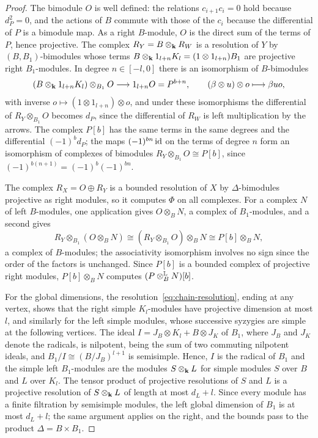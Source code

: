 \begin{proof}
  The bimodule $O$ is well defined: the relations ${c_{i+1}c_i=0}$ hold because
  ${d_P^2=0}$, and the actions of $B$ commute with those of the $c_i$ because the
  differential of $P$ is a bimodule map. As a right $B$-module, $O$ is the
  direct sum of the terms of $P$, hence projective. The complex
  ${R_Y=B\otimes_{\mathbf{k}} R_W}$ is a resolution of $Y$ by $(B,B_1)$-bimodules whose
  terms ${B\otimes_{\mathbf{k}}1_{l+n}K_l=(1\otimes1_{l+n})B_1}$ are projective right
  $B_1$-modules. In degree ${n\in[-l,0]}$ there is an isomorphism of
  $B$-bimodules
  \[
    (B\otimes_{\mathbf{k}}1_{l+n}K_l)\otimes_{B_1}O\longrightarrow1_{l+n}O=P^{b+n},
    \qquad(\beta\otimes u)\otimes o\longmapsto\beta uo,
  \]
  with inverse ${o\mapsto(1\otimes1_{l+n})\otimes o}$, and under these
  isomorphisms the differential of ${R_Y\otimes_{B_1}O}$ becomes $d_P$, since
  the differential of $R_W$ is left multiplication by the arrows. The complex
  $P[b]$ has the same terms in the same degrees and the differential
  ${(-1)^bd_P}$; the maps ${(-1)^{bn}\id}$ on the terms of degree $n$ form an
  isomorphism of complexes of bimodules ${R_Y\otimes_{B_1}O\cong P[b]}$, since
  ${(-1)^{b(n+1)}=(-1)^b(-1)^{bn}}$.

  The complex ${R_X=O\oplus R_Y}$ is a bounded resolution of $X$ by
  $\Delta$-bimodules projective as right modules, so it computes $\Phi$ on all
  complexes. For a complex $N$ of left $B$-modules, one application gives
  ${O\otimes_BN}$, a complex of $B_1$-modules, and a second gives
  \[
    R_Y\otimes_{B_1}(O\otimes_BN)\cong(R_Y\otimes_{B_1}O)\otimes_BN
    \cong P[b]\otimes_BN,
  \]
  a complex of $B$-modules; the associativity isomorphism involves no sign
  since the order of the factors is unchanged. Since $P[b]$ is a bounded complex
  of projective right modules, ${P[b]\otimes_BN}$ computes
  ${(P\Lotimes[B]N)[b]}$.

  For the global dimensions, the resolution~\eqref{eq:chain-resolution},
  ending at any vertex, shows that the right simple $K_l$-modules have
  projective dimension at most $l$, and similarly for the left simple modules,
  whose successive syzygies are simple at the following vertices. The ideal
  ${I=J_B\otimes K_l+B\otimes J_K}$ of $B_1$, where $J_B$ and $J_K$ denote the
  radicals, is nilpotent, being the sum of two commuting nilpotent ideals, and
  ${B_1/I\cong(B/J_B)^{l+1}}$ is semisimple. Hence, $I$ is the radical of $B_1$
  and the simple left $B_1$-modules are the modules ${S\otimes_{\mathbf{k}} L}$ for simple
  modules $S$ over $B$ and $L$ over $K_l$. The tensor product of projective
  resolutions of $S$ and $L$ is a projective resolution of ${S\otimes_{\mathbf{k}} L}$ of
  length at most ${d_L+l}$. Since every module has a finite filtration by
  semisimple modules, the left global dimension of $B_1$ is at most ${d_L+l}$;
  the same argument applies on the right, and the bounds pass to the product
  ${\Delta=B\times B_1}$.
\end{proof}


